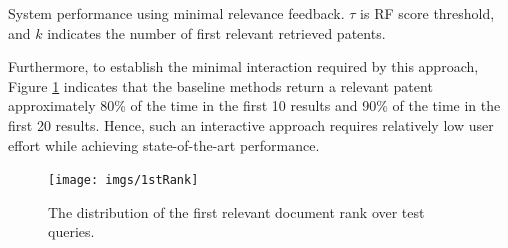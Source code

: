 \begin{table}[t!]
  \begin{center}
   \caption{System performance using minimal relevance feedback. $\tau$ is RF score threshold, and $k$ indicates the number of first relevant retrieved patents.}\vspace{3mm}
     
  \label{tab:firstrel}
  \end{center}  
\end{table}

Furthermore, to establish the minimal interaction required by this
approach, Figure \ref{fig:FirstTPRankHisto} indicates that the
baseline methods return a relevant patent approximately 80\% of the
time in the first 10 results and 90\% of the time in the first 20
results.  Hence, such an interactive approach requires relatively low
user effort while achieving state-of-the-art performance.


\begin{figure}
\begin{centering}
\texttt{[image: imgs/1stRank]}
\par\end{centering}

\protect\caption{The distribution of the first relevant document rank over test queries.}
\label{fig:FirstTPRankHisto}
\end{figure}


